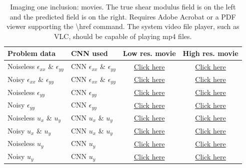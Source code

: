 \documentclass[12pt]{article}
\begin{document}
\begin{table}
  \centering
  \begin{tabular}{|l|l|c|c|}
    \hline
    Problem data & CNN used & Low res. movie  & High res. movie\\
    \hline
    Noiseless $\epsilon_{xx}$ \& $\epsilon_{yy}$ & CNN $\epsilon_{xx}$ \& $\epsilon_{yy}$ &
    \href{run:movies/one/field\_strainxxyy\_noise\_0.0\_movie.mp4}{Click here} & 
    \href{run:movies\_hi\_res/one/field\_strainxxyy\_noise\_0.0\_movie\_hires.mp4}{Click here}\\
    \hline
    Noisy $\epsilon_{xx}$ \& $\epsilon_{yy}$ & CNN $\epsilon_{xx}$ \& $\epsilon_{yy}$ &
    \href{run:movies/one/field\_strainxxyy\_noise\_0.02\_movie.mp4}{Click here} &
    \href{run:movies\_hi\_res/one/field\_strainxxyy\_noise\_0.02\_movie\_hires.mp4}{Click here}\\ 
    \hline
    Noiseless $\epsilon_{yy}$ & CNN $\epsilon_{yy}$ &
    \href{run:movies/one/field\_strainyy\_noise\_0.0\_movie.mp4}{Click here} &
    \href{run:movies\_hi\_res/one/field\_strainyy\_noise\_0.0\_movie\_hires.mp4}{Click here}\\
    \hline
    Noisy $\epsilon_{yy}$ & CNN $\epsilon_{yy}$ &
    \href{run:movies/one/field\_strainyy\_noise\_0.02\_movie.mp4}{Click here} &
    \href{run:movies\_hi\_res/one/field\_strainyy\_noise\_0.02\_movie\_hires.mp4}{Click here}\\
    \hline
    Noiseless $u_x$ \& $u_y$ & CNN $u_x$ \& $u_y$ &
    \href{run:movies/one/field\_images\_noise\_0.0\_movie.mp4}{Click here} &
    \href{run:movies\_hi\_res/one/field\_images\_noise\_0.0\_movie\_hires.mp4}{Click here}\\
    \hline
    Noisy $u_x$ \& $u_y$ & CNN $u_x$ \& $u_y$ &
    \href{run:movies/one/field\_images\_noise\_0.02\_movie.mp4}{Click here} &
    \href{run:movies\_hi\_res/one/field\_images\_noise\_0.02\_movie\_hires.mp4}{Click here}\\
    \hline
    Noiseless $u_y$ & CNN $u_y$ &
    \href{run:movies/one/field\_imagesy\_noise\_0.0\_movie.mp4}{Click here} &
    \href{run:movies\_hi\_res/one/field\_imagesy\_noise\_0.0\_movie\_hires.mp4}{Click here}\\
    \hline
    Noisy $u_y$ & CNN $u_y$ &
    \href{run:movies/one/field\_imagesy\_noise\_0.02\_movie.mp4}{Click here} &
    \href{run:movies\_hi\_res/one/field\_imagesy\_noise\_0.02\_movie\_hires.mp4}{Click here}\\
    \hline
  \end{tabular}
  \caption{\label{fig:oneinc:movie} Imaging one inclusion: movies. The true shear modulus field is on the left and the predicted field is on the right. Requires Adobe Acrobat or a PDF viewer supporting the \textbackslash{href} command. The system video file player, such as VLC, should be capable of playing mp4 files.}
\end{table}
\end{document}
